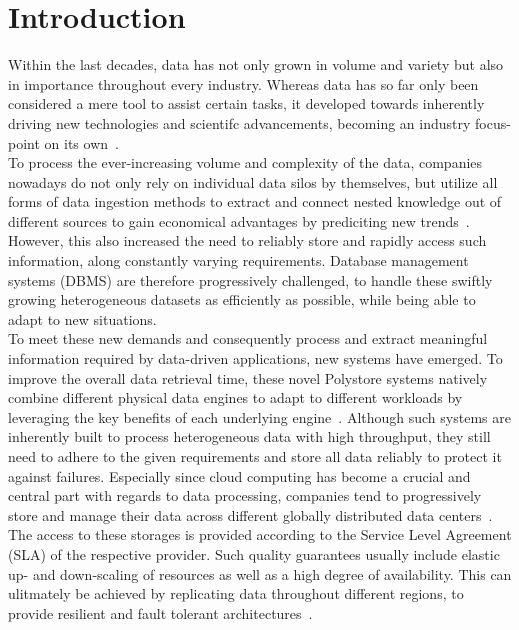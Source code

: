 \chapter{Introduction}
\label{c:intro}

Within the last decades, data has not only grown in volume and variety but also in importance throughout every industry. 
Whereas data has so far only been considered a mere tool to assist certain tasks, it developed towards inherently
driving new technologies and scientifc advancements, becoming an industry focus-point on its own~\cite{data-driven_2014}.\\
To process the ever-increasing volume and complexity of the data, companies nowadays do not only rely on individual data silos by themselves, but utilize 
all forms of data ingestion methods to extract and connect nested knowledge out of different sources 
to gain economical advantages by prediciting new trends~\cite{ingestion_2016}.
However, this also increased the need to reliably store and rapidly access such information, along constantly varying requirements.
Database management systems (DBMS) are therefore progressively challenged, to handle these swiftly growing heterogeneous datasets as efficiently as possible,
while being able to adapt to new situations.\\
To meet these new demands and consequently process and extract meaningful information required by data-driven applications, new systems have emerged.
To improve the overall data retrieval time, these novel Polystore systems natively combine different physical data engines to 
adapt to different workloads by leveraging the key benefits of each underlying engine~\cite{stonebraker:2005, polypheny2020}. 
Although such systems are inherently built to process heterogeneous data with high throughput, they still need to adhere to the given requirements
and store all data reliably to protect it against failures.  
Especially since cloud computing has become a crucial and central part with regards to data processing, 
companies tend to progressively store and manage their data across different globally distributed data centers~\cite{claremont:2005}. 
The access to these storages is provided according to the Service Level Agreement (SLA) of the respective provider.
Such quality guarantees usually include elastic up- and down-scaling of resources as well as a high degree of availability.
This can ulitmately be achieved by replicating data throughout different regions, to provide resilient and fault tolerant architectures~\cite{brinkmann:2015, terry:2013}.\\
